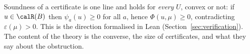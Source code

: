 Soundness of a certificate is one line and holds for \emph{every} $U$, convex or not: if $u\in\calR(B)$ then $\psi_a(u)\ge0$ for all $a$, hence $\Phi(u,\mu)\ge0$, contradicting $\varepsilon(\mu)>0$. This is the direction formalised in Lean (Section~\ref{sec:verification}). The content of the theory is the converse, the size of certificates, and what they say about the obstruction.
